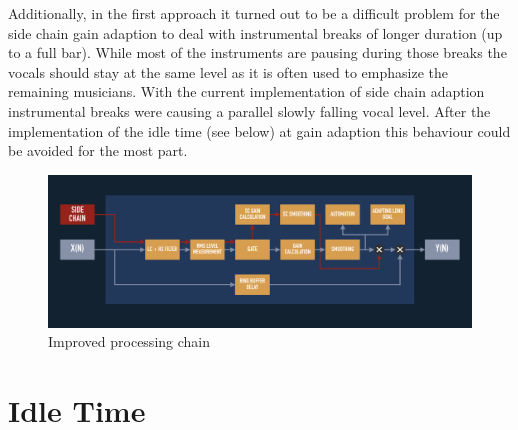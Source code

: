 Additionally, in the first approach it turned out to be a difficult problem for the side chain gain adaption to deal with instrumental breaks of longer duration (up to a full bar). While most of the instruments are pausing during those breaks the vocals should stay at the same level as it is often used to emphasize the remaining musicians. With the current implementation of side chain adaption instrumental breaks were causing a parallel slowly falling vocal level. After the implementation of the idle time (see below) at gain adaption this behaviour could be avoided for the most part.\\

\begin{figure}[H]
\includegraphics[width=\textwidth]{images/chain02}
\caption{Improved processing chain}
\label{Chain2}
\end{figure}

\section{Idle Time}

